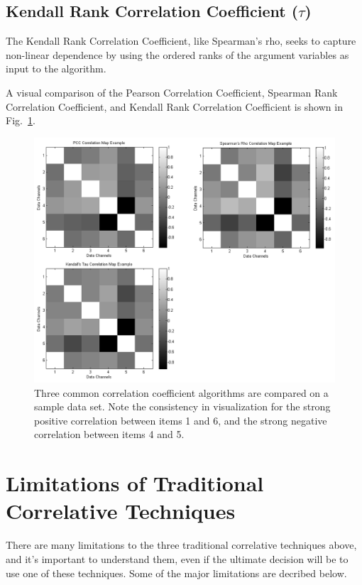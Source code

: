 \subsection{Kendall Rank Correlation Coefficient ($\tau$)}

The Kendall Rank Correlation Coefficient, like Spearman's rho, seeks to capture non-linear dependence by using the ordered ranks of the argument variables as input to the algorithm.

A visual comparison of the Pearson Correlation Coefficient, Spearman Rank Correlation Coefficient, and Kendall Rank Correlation Coefficient is shown in Fig.~\ref{fig:correlation_comparison}.

\begin{figure}[h]
\centering
    \includegraphics[width=\columnwidth]{images/correlation_comparison.png}
    \caption{Three common correlation coefficient algorithms are compared on a sample data set. Note the consistency in visualization for the strong positive correlation between items 1 and 6, and the strong negative correlation between items 4 and 5.}
    \label{fig:correlation_comparison}
\end{figure}





\section{Limitations of Traditional Correlative Techniques}

There are many limitations to the three traditional correlative techniques above, and it's important to understand them, even if the ultimate decision will be to use one of these techniques. Some of the major limitations are decribed below.


